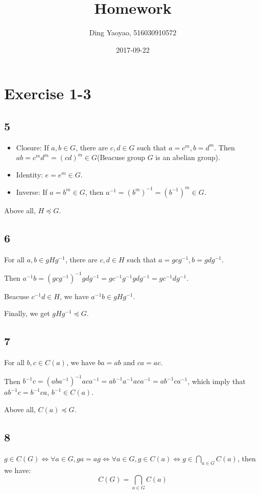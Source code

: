 \documentclass{article}
\title{Homework}
\date{2017-09-22}
\author{Ding Yaoyao, 516030910572}
\begin{document}
	\maketitle

	\section*{Exercise 1-3}
		\subsection*{5}

		\begin{itemize}
			\item Closure: If $a,b \in G$, there are $c,d \in G$ such that $a = c^m, b
				= d^m$. Then $ab=c^md^m=(cd)^m \in G$(Beacuse group $G$ is an abelian
				group).
			\item Identity: $e = e^m \in G$.
			\item Inverse: If $a = b^m \in G$, then $a^{-1} = (b^m)^{-1} = (b^{-1})^m
				\in G$.
		\end{itemize}

		Above all, $H \preccurlyeq G$.

		\subsection{6}

		For all $a, b \in gHg^{-1}$, there are $c,d \in H$ such that $a = gcg^{-1},
		b = gdg^{-1}$.

		Then $a^{-1}b = (gcg^{-1})^{-1}gdg^{-1} = gc^{-1}g^{-1}gdg^{-1} =
		gc^{-1}dg^{-1}$.

		Beacuse $c^{-1}d \in H$, we have $a^{-1}b \in gHg^{-1}$. 

		Finally, we get $gHg^{-1} \preccurlyeq G$.

		\subsection*{7}	

		For all $b, c \in C(a)$, we have $ba = ab$ and $ca = ac$.

		Then $b^{-1}c = (aba^{-1})^{-1}aca^{-1} = ab^{-1}a^{-1}aca^{-1} =
		ab^{-1}ca^{-1}$, which imply that $ab^{-1}c=b^{-1}ca$, $b^{-1} \in C(a)$.

		Above all, $C(a) \preccurlyeq G$.

		\subsection*{8}
			$g \in C(G) \Leftrightarrow \forall a \in G, ga=ag \Leftrightarrow \forall
			a \in G, g \in C(a) \Leftrightarrow g \in \bigcap_{a \in G}C(a)$, then we
			have:
			$$
				C(G) = \bigcap_{a \in G}C(a)
			$$
\end{document}
